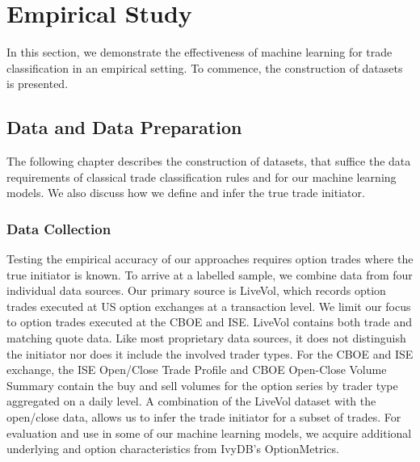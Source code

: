 \section{Empirical Study}\label{sec:empirical-study}

In this section, we demonstrate the effectiveness of machine learning for trade classification in an empirical setting. To commence, the construction of datasets is presented.

\subsection{Data and Data Preparation}\label{sec:data-and-data-preparation}

The following chapter describes the construction of datasets, that suffice the data requirements of classical trade classification rules and for our machine learning models. We also discuss how we define and infer the true trade initiator.

\subsubsection{Data Collection}\label{sec:data-collection}


Testing the empirical accuracy of our approaches requires option trades where the true initiator is known. To arrive at a labelled sample, we combine data from four individual data sources. Our primary source is LiveVol, which records option trades executed at US option exchanges at a transaction level. We limit our focus to option trades executed at the \gls{CBOE} and \gls{ISE}. LiveVol contains both trade and matching quote data. Like most proprietary data sources, it does not distinguish the initiator nor does it include the involved trader types. For the \gls{CBOE} and \gls{ISE} exchange, the \gls{ISE} Open/Close Trade Profile and \gls{CBOE} Open-Close Volume Summary contain the buy and sell volumes for the option series by trader type aggregated on a daily level. A combination of the LiveVol dataset with the open/close data, allows us to infer the trade initiator for a subset of trades. For evaluation and use in some of our machine learning models, we acquire additional underlying and option characteristics from IvyDB's OptionMetrics.


